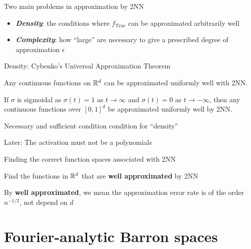 \documentclass[aspectratio=32]{beamer}
\begin{document}
\begin{frame}{Two main problems in approximation by 2NN}
    \begin{itemize}
        \item \textit{\textbf{Density}}: the conditions where
              $f_{\text{True}}$ can be approximated arbitrarily well
        \item \textit{\textbf{Complexity}}: how ``large'' are necessary to give
              a prescribed degree of approximation $\epsilon$
    \end{itemize}

\end{frame}

\begin{frame}{Density: Cybenko's Universal Approximation Theorem}

    Any continuous functions on $\mathbb{R}^d$ can be approximated uniformly well with
    2NN.

    \begin{theorem}
        If $\sigma$ is sigmoidal as $\sigma(t)=1$ as $t \to \infty$ and
        $\sigma(t)=0$ as $t \to -\infty$, then any continuous functions over
        $[0,1]^d $ be approximated uniformly well by 2NN.
    \end{theorem}

    Necessary and sufficient condition condition for ``density''

    \vspace*{1em}

    Later: The activation must not be a polynomials
    \citep{leshnoMultilayerFeedforwardNetworks1993}
\end{frame}

\begin{frame}{Finding the correct function spaces associated with 2NN}

    \begin{center}
        {
            Find the functions in $\mathbb{R}^d$ that are \textbf{well approximated} by 2NN
        }
    \end{center}

    \vspace{2em}

    By \textbf{well approximated}, we mean the approximation error rate is of 
    the order $n^{-1/2}$, not depend on $d$


\end{frame}

\section{Fourier-analytic Barron spaces}
\end{document}
